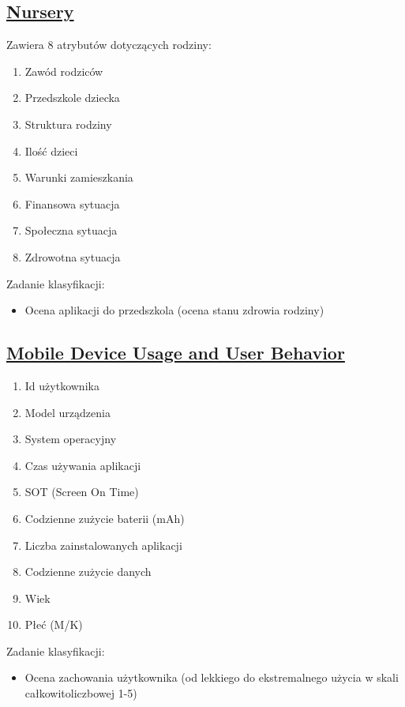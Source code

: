 \documentclass[11pt]{article}
\begin{document}
\subsection{\href{https://www.kaggle.com/datasets/nimapourmoradi/nursery}{Nursery}}
\label{sec:org0f4e062}
Zawiera 8 atrybutów dotyczących rodziny:
\begin{enumerate}
\item Zawód rodziców
\item Przedszkole dziecka
\item Struktura rodziny
\item Ilość dzieci
\item Warunki zamieszkania
\item Finansowa sytuacja
\item Społeczna sytuacja
\item Zdrowotna sytuacja
\end{enumerate}
Zadanie klasyfikacji:
\begin{itemize}
\item Ocena aplikacji do przedszkola (ocena stanu zdrowia rodziny)
\end{itemize}
\subsection{\href{https://www.kaggle.com/datasets/valakhorasani/mobile-device-usage-and-user-behavior-dataset}{Mobile Device Usage and User Behavior}}
\label{sec:org2f897e3}
\begin{enumerate}
\item Id użytkownika
\item Model urządzenia
\item System operacyjny
\item Czas używania aplikacji
\item SOT (Screen On Time)
\item Codzienne zużycie baterii (mAh)
\item Liczba zainstalowanych aplikacji
\item Codzienne zużycie danych
\item Wiek
\item Płeć (M/K)
\end{enumerate}
Zadanie klasyfikacji:
\begin{itemize}
\item Ocena zachowania użytkownika (od lekkiego do ekstremalnego użycia w skali całkowitoliczbowej 1-5)
\end{itemize}
\end{document}
